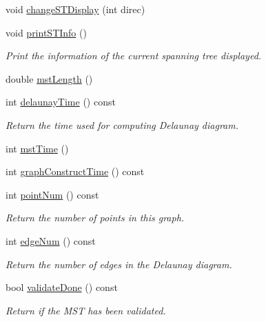 \begin{DoxyCompactItemize}
void \hyperlink{classcmst_1_1_graph2_d_abb6cf2245d6ac93f5553e28f8723fce5}{change\+S\+T\+Display} (int direc)
\item 
void \hyperlink{classcmst_1_1_graph2_d_a547a65e56068434928777eb7b4e59510}{print\+S\+T\+Info} ()
\begin{DoxyCompactList}\small\item\em Print the information of the current spanning tree displayed. \end{DoxyCompactList}\item 
double \hyperlink{classcmst_1_1_graph2_d_aea22c23fdbb3b9e91671562cb19730ed}{mst\+Length} ()
\item 
int \hyperlink{classcmst_1_1_graph2_d_a93a1d4d5d2dd08796e37bcba6de79341}{delaunay\+Time} () const 
\begin{DoxyCompactList}\small\item\em Return the time used for computing Delaunay diagram. \end{DoxyCompactList}\item 
int \hyperlink{classcmst_1_1_graph2_d_a3b596946f310f7024036d2c6a18985a3}{mst\+Time} ()
\item 
int \hyperlink{classcmst_1_1_graph2_d_ad4756aa3f617493bd8b3f6ecfe099449}{graph\+Construct\+Time} () const 
\item 
int \hyperlink{classcmst_1_1_graph2_d_a0b18b38d5813b2fdbe8f5a8d6f92575d}{point\+Num} () const 
\begin{DoxyCompactList}\small\item\em Return the number of points in this graph. \end{DoxyCompactList}\item 
int \hyperlink{classcmst_1_1_graph2_d_ae2474e4dd9964cd18fc9926a296c82fd}{edge\+Num} () const 
\begin{DoxyCompactList}\small\item\em Return the number of edges in the Delaunay diagram. \end{DoxyCompactList}\item 
bool \hyperlink{classcmst_1_1_graph2_d_ab7fbcf59b9ef4e9cc10015fd610cb4fc}{validate\+Done} () const 
\begin{DoxyCompactList}\small\item\em Return if the M\+ST has been validated. \end{DoxyCompactList}\end{DoxyCompactItemize}
